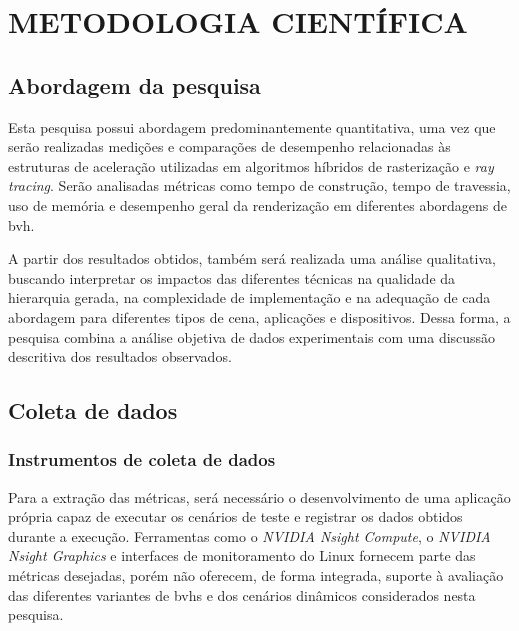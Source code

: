 \chapter{METODOLOGIA CIENTÍFICA}


\section{Abordagem da pesquisa}

Esta pesquisa possui abordagem predominantemente quantitativa, uma vez que serão realizadas medições e comparações de desempenho relacionadas às estruturas de aceleração utilizadas em algoritmos híbridos de rasterização e \textit{ray tracing}. Serão analisadas métricas como tempo de construção, tempo de travessia, uso de memória e desempenho geral da renderização em diferentes abordagens de \gls{bvh}.

A partir dos resultados obtidos, também será realizada uma análise qualitativa, buscando interpretar os impactos das diferentes técnicas na qualidade da hierarquia gerada, na complexidade de implementação e na adequação de cada abordagem para diferentes tipos de cena, aplicações e dispositivos. Dessa forma, a pesquisa combina a análise objetiva de dados experimentais com uma discussão descritiva dos resultados observados.

\section{Coleta de dados}

\subsection{Instrumentos de coleta de dados}

Para a extração das métricas, será necessário o desenvolvimento de uma aplicação própria capaz de executar os cenários de teste e registrar os dados obtidos durante a execução. Ferramentas como o \textit{NVIDIA Nsight Compute}, o \textit{NVIDIA Nsight Graphics} e interfaces de monitoramento do Linux fornecem parte das métricas desejadas, porém não oferecem, de forma integrada, suporte à avaliação das diferentes variantes de \glspl{bvh} e dos cenários dinâmicos considerados nesta pesquisa.

